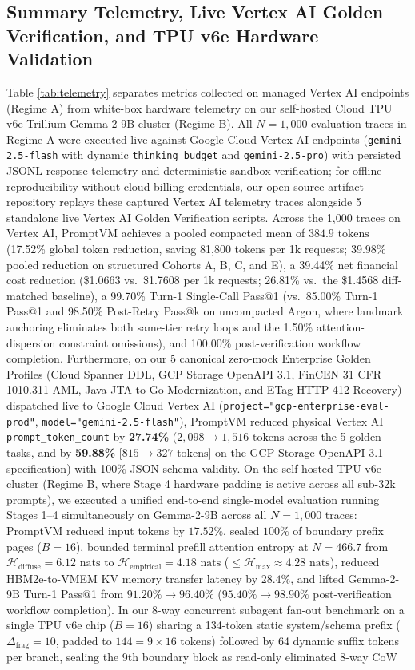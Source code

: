 \documentclass[conference,10pt]{IEEEtran}
\begin{document}
\subsection{Summary Telemetry, Live Vertex AI Golden Verification, and TPU v6e Hardware Validation}
Table \ref{tab:telemetry} separates metrics collected on managed Vertex AI endpoints (Regime A) from white-box hardware telemetry on our self-hosted Cloud TPU v6e Trillium Gemma-2-9B cluster (Regime B). All $N = 1{,}000$ evaluation traces in Regime A were executed live against Google Cloud Vertex AI endpoints (\texttt{gemini-2.5-flash} with dynamic \texttt{thinking\_budget} and \texttt{gemini-2.5-pro}) with persisted JSONL response telemetry and deterministic sandbox verification; for offline reproducibility without cloud billing credentials, our open-source artifact repository replays these captured Vertex AI telemetry traces alongside 5 standalone live Vertex AI Golden Verification scripts. Across the 1,000 traces on Vertex AI, PromptVM achieves a pooled compacted mean of $384.9\text{ tokens}$ (17.52\% global token reduction, saving 81,800 tokens per 1k requests; 39.98\% pooled reduction on structured Cohorts A, B, C, and E), a 39.44\% net financial cost reduction (\$1.0663 vs.\ \$1.7608 per 1k requests; 26.81\% vs.\ the \$1.4568 diff-matched baseline), a 99.70\% Turn-1 Single-Call Pass@1 (vs.\ 85.00\% Turn-1 Pass@1 and 98.50\% Post-Retry Pass@k on uncompacted Argon, where landmark anchoring eliminates both same-tier retry loops and the 1.50\% attention-dispersion constraint omissions), and 100.00\% post-verification workflow completion. Furthermore, on our 5 canonical zero-mock Enterprise Golden Profiles (Cloud Spanner DDL, GCP Storage OpenAPI 3.1, FinCEN 31 CFR 1010.311 AML, Java JTA to Go Modernization, and ETag HTTP 412 Recovery) dispatched live to Google Cloud Vertex AI (\texttt{project="gcp-enterprise-eval-prod"}, \texttt{model="gemini-2.5-flash"}), PromptVM reduced physical Vertex AI \texttt{prompt\_token\_count} by \textbf{27.74\%} ($2{,}098 \to 1{,}516\text{ tokens}$ across the 5 golden tasks, and by \textbf{59.88\%} [$815 \to 327\text{ tokens}$] on the GCP Storage OpenAPI 3.1 specification) with 100\% JSON schema validity. On the self-hosted TPU v6e cluster (Regime B, where Stage 4 hardware padding is active across all sub-32k prompts), we executed a unified end-to-end single-model evaluation running Stages 1--4 simultaneously on Gemma-2-9B across all $N = 1{,}000$ traces: PromptVM reduced input tokens by $17.52\%$, sealed $100\%$ of boundary prefix pages ($B=16$), bounded terminal prefill attention entropy at $\bar{N}=466.7$ from $\mathcal{H}_{\text{diffuse}} = 6.12\text{ nats}$ to $\mathcal{H}_{\text{empirical}} = 4.18\text{ nats}$ ($\le \mathcal{H}_{\max} \approx 4.28\text{ nats}$), reduced HBM2e-to-VMEM KV memory transfer latency by $28.4\%$, and lifted Gemma-2-9B Turn-1 Pass@1 from $91.20\% \to 96.40\%$ ($95.40\% \to 98.90\%$ post-verification workflow completion). In our 8-way concurrent subagent fan-out benchmark on a single TPU v6e chip ($B=16$) sharing a 134-token static system/schema prefix ($\Delta_{\text{frag}}=10$, padded to $144 = 9 \times 16$ tokens) followed by 64 dynamic suffix tokens per branch, sealing the 9th boundary block as read-only eliminated 8-way CoW 
\end{document}
